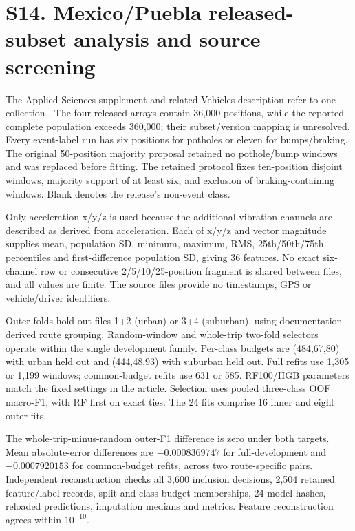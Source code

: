 \section*{S14. Mexico/Puebla released-subset analysis and source screening}
The Applied Sciences supplement and related Vehicles description refer to one collection \citep{mexico2025,mexico2026}. The four released arrays contain 36,000 positions, while the reported complete population exceeds 360,000; their subset/version mapping is unresolved. Every event-label run has six positions for potholes or eleven for bumps/braking. The original 50-position majority proposal retained no pothole/bump windows and was replaced before fitting. The retained protocol fixes ten-position disjoint windows, majority support of at least six, and exclusion of braking-containing windows. Blank denotes the release's non-event class.

Only acceleration x/y/z is used because the additional vibration channels are described as derived from acceleration. Each of x/y/z and vector magnitude supplies mean, population SD, minimum, maximum, RMS, 25th/50th/75th percentiles and first-difference population SD, giving 36 features. No exact six-channel row or consecutive 2/5/10/25-position fragment is shared between files, and all values are finite. The source files provide no timestamps, GPS or vehicle/driver identifiers.

Outer folds hold out files 1+2 (urban) or 3+4 (suburban), using documentation-derived route grouping. Random-window and whole-trip two-fold selectors operate within the single development family. Per-class budgets are (484,67,80) with urban held out and (444,48,93) with suburban held out. Full refits use 1,305 or 1,199 windows; common-budget refits use 631 or 585. RF100/HGB parameters match the fixed settings in the article. Selection uses pooled three-class OOF macro-F1, with RF first on exact ties. The 24 fits comprise 16 inner and eight outer fits.

The whole-trip-minus-random outer-F1 difference is zero under both targets. Mean absolute-error differences are $-0.0008369747$ for full-development and $-0.0007920153$ for common-budget refits, across two route-specific pairs. Independent reconstruction checks all 3,600 inclusion decisions, 2,504 retained feature/label records, split and class-budget memberships, 24 model hashes, reloaded predictions, imputation medians and metrics. Feature reconstruction agrees within $10^{-10}$.

